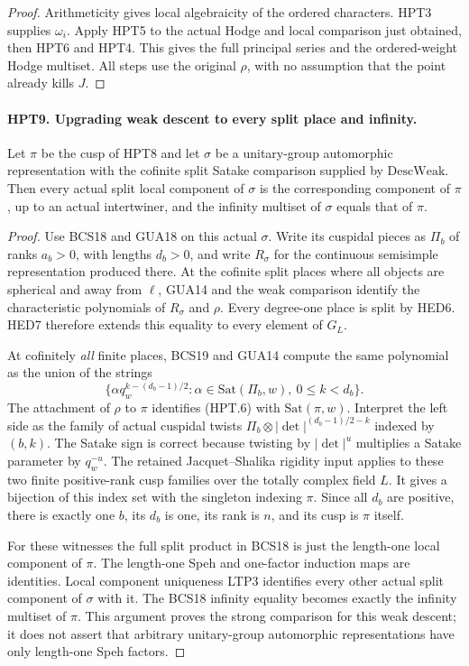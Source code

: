 \begin{proof}
Arithmeticity gives local algebraicity of the ordered characters.
HPT3 supplies $\omega_i$.  Apply HPT5 to the actual Hodge and
local comparison just obtained, then HPT6 and HPT4.
This gives the full principal series and the ordered-weight
Hodge multiset.  All steps use the original $\rho$, with no
assumption that the point already kills $J$.
\end{proof}

\paragraph{HPT9. Upgrading weak descent to every split place and infinity.}
\label{claim:HPT9}
Let $\pi$ be the cusp of HPT8 and let $\sigma$ be a unitary-group
automorphic representation with the cofinite split Satake
comparison supplied by $\mathrm{DescWeak}$.  Then every actual
split local component of $\sigma$ is the corresponding component
of $\pi$, up to an actual intertwiner, and the infinity multiset
of $\sigma$ equals that of $\pi$.
\begin{proof}
Use BCS18 and GUA18 on this actual $\sigma$.  Write its cuspidal
pieces as $\Pi_b$ of ranks $a_b>0$, with lengths $d_b>0$, and
write $R_\sigma$ for the continuous semisimple representation
produced there.  At the cofinite split places where all objects
are spherical and away from $\ell$, GUA14 and the weak comparison
identify the characteristic polynomials of $R_\sigma$ and
$\rho$.  Every degree-one place is split by HED6.  HED7 therefore
extends this equality to every element of $G_L$.

At cofinitely \emph{all} finite places, BCS19 and GUA14 compute
the same polynomial as the union of the strings
\[
       \{\alpha q_w^{k-(d_b-1)/2}:
                  \alpha\in\mathrm{Sat}(\Pi_b,w),\ 0\leq k<d_b\}.
                                                               \tag{HPT.6}
\]
The attachment of $\rho$ to $\pi$ identifies (HPT.6) with
$\mathrm{Sat}(\pi,w)$.  Interpret the left side as the family
of actual cuspidal twists
$\Pi_b\otimes|\det|^{(d_b-1)/2-k}$ indexed by $(b,k)$.
The Satake sign is correct because twisting by $|\det|^u$
multiplies a Satake parameter by $q_w^{-u}$.
The retained Jacquet--Shalika rigidity input applies to these
two finite positive-rank cusp families over the totally complex
field $L$.  It gives a bijection of this index set with the
singleton indexing $\pi$.  Since all $d_b$ are positive, there
is exactly one $b$, its $d_b$ is one, its rank is $n$, and
its cusp is $\pi$ itself.

For these witnesses the full split product in BCS18 is just the
length-one local component of $\pi$.  The length-one Speh and
one-factor induction maps are identities.  Local component
uniqueness LTP3 identifies every other actual split component
of $\sigma$ with it.  The BCS18 infinity equality becomes
exactly the infinity multiset of $\pi$.  This argument proves
the strong comparison for this weak descent; it does not assert
that arbitrary unitary-group automorphic representations have
only length-one Speh factors.
\end{proof}

